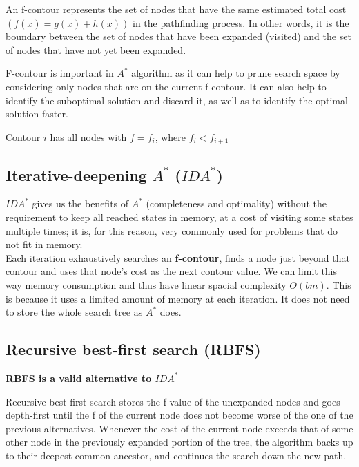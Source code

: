 \documentclass{article}
\begin{document}
An f-contour represents the set of nodes that have the same estimated total cost $(f(x) = g(x) + h(x))$ in the pathfinding process. In other words, it is the boundary between the set of nodes that have been expanded (visited) and the set of nodes that have not yet been expanded.

F-contour is important in $A^*$ algorithm as it can help to prune search space by considering only nodes that are on the current f-contour. It can also help to identify the suboptimal solution and discard it, as well as to identify the optimal solution faster.

\begin{center}
    Contour $i$ has all nodes with $f = f_i$, where $f_i < f_{i+1}$
\end{center}

\subsection{Iterative-deepening $A^*$ ($IDA^*$)}

$IDA^*$ gives us the benefits of $A^*$ (completeness and optimality) without the requirement to keep all reached states in memory, at a cost of visiting some states multiple times; it is, for this reason, very commonly used for problems that do not fit in memory. \\

Each iteration exhaustively searches an \textbf{f-contour}, finds a node just beyond that contour and uses that node's cost as the next contour value. We can limit this way memory consumption and thus have linear spacial complexity $O(bm)$. This is because it uses a limited amount of memory at each iteration. It does not need to store the whole search tree as $A^*$ does.

\newpage

\subsection{Recursive best-first search (RBFS)}

\textbf{RBFS is a valid alternative to $IDA^*$}

Recursive best-first search stores the f-value of the unexpanded nodes and goes depth-first until the f of the current node does not become worse of the one of the previous alternatives. Whenever the cost of the current node exceeds that of some other node in the previously expanded portion of the tree, the algorithm backs up to their deepest common ancestor, and continues the search down the new path. \\
\end{document}
